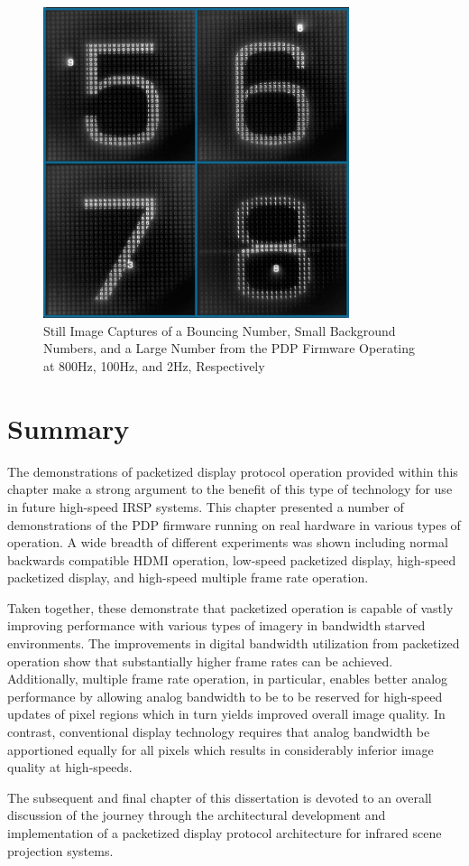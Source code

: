         \begin{figure}[t]
            \centering
            \includegraphics[width=0.80\textwidth]{fig/pdp_multi_frame_rate.jpg}
            \caption{Still Image Captures of a Bouncing Number, Small Background Numbers, and a Large Number from the PDP Firmware Operating at 800Hz, 100Hz, and 2Hz, Respectively}
            \label{fig:pdp_multi_frame_rate}
        \end{figure}

\section{Summary}
    The demonstrations of packetized display protocol operation provided within this chapter make a strong argument to the benefit of this type of technology for use in future high-speed IRSP systems. This chapter presented a number of demonstrations of the PDP firmware running on real hardware in various types of operation. A wide breadth of different experiments was shown including normal backwards compatible HDMI operation, low-speed packetized display, high-speed packetized display, and high-speed multiple frame rate operation.

    Taken together, these demonstrate that packetized operation is capable of vastly improving performance with various types of imagery in bandwidth starved environments. The improvements in digital bandwidth utilization from packetized operation show that substantially higher frame rates can be achieved. Additionally, multiple frame rate operation, in particular, enables better analog performance by allowing analog bandwidth to be to be reserved for high-speed updates of pixel regions which in turn yields improved overall image quality. In contrast, conventional display technology requires that analog bandwidth be apportioned equally for all pixels which results in considerably inferior image quality at high-speeds.

    The subsequent and final chapter of this dissertation is devoted to an overall discussion of the journey through the architectural development and implementation of a packetized display protocol architecture for infrared scene projection systems.
